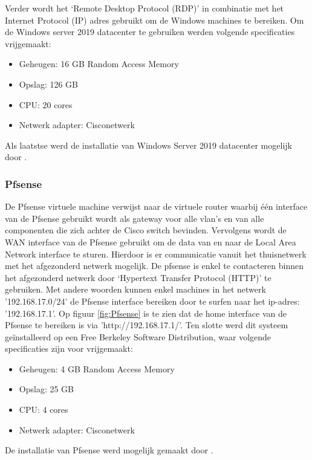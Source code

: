 Verder wordt het ‘Remote Desktop Protocol (RDP)’ in combinatie met het Internet Protocol (IP) adres gebruikt om de Windows machines te bereiken.
\newline
\newline
Om de Windows server 2019 datacenter te gebruiken werden volgende specificaties vrijgemaakt:

\begin{itemize}
	\item Geheugen: 16 GB Random Access Memory
	\item Opslag: 126 GB
	\item CPU: 20 cores
	\item Netwerk adapter: Cisco\textunderscore netwerk
\end{itemize}

Als laatstse werd de installatie van Windows Server 2019 datacenter mogelijk door \cite{Win19_InstallationGuide}. 

\subsubsection{Pfsense}
De Pfsense virtuele machine verwijst naar de virtuele router waarbij één interface van de Pfsense gebruikt wordt als gateway voor alle vlan’s en van alle componenten die zich achter de Cisco switch bevinden. Vervolgens wordt de WAN interface van de Pfsense gebruikt om de data van en naar de Local Area Network interface te sturen. Hierdoor is er communicatie vanuit het thuisnetwerk met het afgezonderd netwerk mogelijk.
\newline
\newline
De pfsense is enkel te contacteren binnen het afgezonderd netwerk door ‘Hypertext Transfer Protocol (HTTP)’ te gebruiken. Met andere woorden kunnen enkel machines in het netwerk '192.168.17.0/24' de Pfsense interface bereiken door te surfen naar het ip-adres: '192.168.17.1'. Op figuur \ref{fig:Pfsense} is te zien dat de home interface van de Pfsense te bereiken is via 'http://192.168.17.1/'.
\newline
\newline
Ten slotte werd dit systeem geïnstalleerd op een Free Berkeley Software Distribution, waar volgende specificaties zijn voor vrijgemaakt:  

\begin{itemize}
	\item Geheugen: 4 GB Random Access Memory
	\item Opslag: 25 GB
	\item CPU: 4 cores
	\item Netwerk adapter: Cisco\textunderscore netwerk
\end{itemize}
De installatie van Pfsense werd mogelijk gemaakt door \cite{Pfsense_InstallationGuide}.


